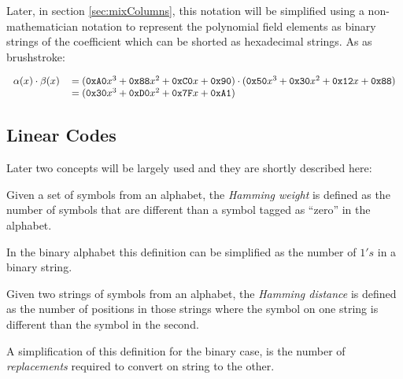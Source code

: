 \documentclass[10pt,a4paper,twoside]{llncs}
\begin{document}
Later, in section \ref{sec:mixColumns}, this notation will be simplified using a non-mathematician notation to represent the polynomial field elements as binary strings of the coefficient which can be shorted as hexadecimal strings. As as brushstroke:

\begin{equation}
 \begin{tabular}{ll}
  $\alpha(x)\cdot \beta(x)$&$=(\texttt{0xA0}x^3+\texttt{0x88}x^2+\texttt{0xC0}x+\texttt{0x90})\cdot (\texttt{0x50}x^3+\texttt{0x30}x^2+\texttt{0x12}x+\texttt{0x88})$\\
  &$= (\texttt{0x30}x^3 + \texttt{0xD0}x^2 + \texttt{0x7F}x + \texttt{0xA1})$
 \end{tabular}
\end{equation}


\subsection{Linear Codes}\label{sec:LinearCodes}

Later two concepts will be largely used and they are shortly described here:

\begin{definition}\label{def:hammingWeight}
    Given a set of symbols from an alphabet, the \emph{Hamming weight} is defined as the number of symbols that are different than a symbol tagged as ``zero'' in the alphabet.
\end{definition}

In the binary alphabet this definition can be simplified as the number of $1's$ in a binary string.

\begin{definition}\label{def:hammingDistance}
    Given two strings of symbols from an alphabet, the \emph{Hamming distance} is defined as the number of positions in those strings where the symbol on one string is different than the symbol in the second.
\end{definition}

A simplification of this definition for the binary case, is the number of \emph{replacements} required to convert on string to the other.

\end{document}
